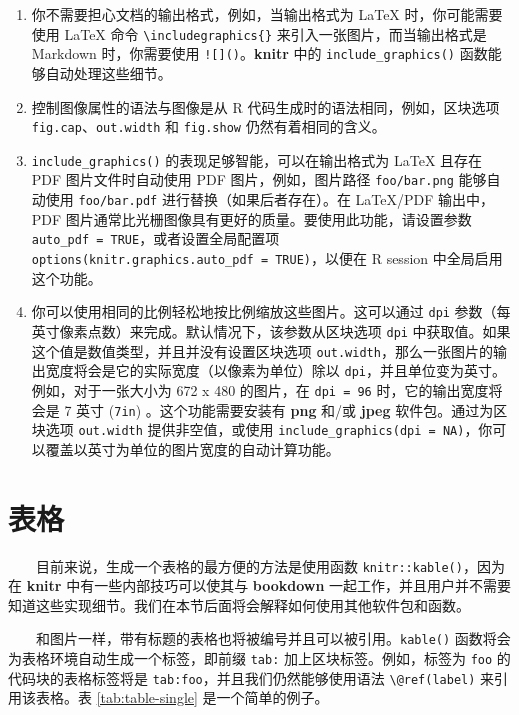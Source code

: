 \documentclass[
  12pt,
]{krantz}
\providecommand{\tightlist}{%
  \setlength{\itemsep}{0pt}\setlength{\parskip}{0pt}}
\theoremstyle{definition}
\theoremstyle{definition}
\theoremstyle{definition}
\theoremstyle{definition}
\theoremstyle{remark}
\begin{document}
\begin{enumerate}
\def\labelenumi{\arabic{enumi}.}
\tightlist
\item
  你不需要担心文档的输出格式，例如，当输出格式为 LaTeX 时，你可能需要使用 LaTeX 命令 \texttt{\textbackslash{}includegraphics\{\}} 来引入一张图片，而当输出格式是 Markdown 时，你需要使用 \texttt{!{[}{]}()}。\textbf{knitr} 中的 \texttt{include\_graphics()} 函数能够自动处理这些细节。
\item
  控制图像属性的语法与图像是从 R 代码生成时的语法相同，例如，区块选项 \texttt{fig.cap}、\texttt{out.width} 和 \texttt{fig.show} 仍然有着相同的含义。
\item
  \texttt{include\_graphics()} 的表现足够智能，可以在输出格式为 LaTeX 且存在 PDF 图片文件时自动使用 PDF 图片，例如，图片路径 \texttt{foo/bar.png} 能够自动使用 \texttt{foo/bar.pdf} 进行替换（如果后者存在）。在 LaTeX/PDF 输出中，PDF 图片通常比光栅图像具有更好的质量。要使用此功能，请设置参数 \texttt{auto\_pdf\ =\ TRUE}，或者设置全局配置项 \texttt{options(knitr.graphics.auto\_pdf\ =\ TRUE)}，以便在 R session 中全局启用这个功能。
\item
  你可以使用相同的比例轻松地按比例缩放这些图片。这可以通过 \texttt{dpi} 参数（每英寸像素点数）来完成。默认情况下，该参数从区块选项 \texttt{dpi} 中获取值。如果这个值是数值类型，并且并没有设置区块选项 \texttt{out.width}，那么一张图片的输出宽度将会是它的实际宽度（以像素为单位）除以 \texttt{dpi}，并且单位变为英寸。例如，对于一张大小为 672 x 480 的图片，在 \texttt{dpi\ =\ 96} 时，它的输出宽度将会是 7 英寸 (\texttt{7in}) 。这个功能需要安装有 \textbf{png} 和/或 \textbf{jpeg} 软件包。通过为区块选项 \texttt{out.width} 提供非空值，或使用 \texttt{include\_graphics(dpi\ =\ NA)}，你可以覆盖以英寸为单位的图片宽度的自动计算功能。
\end{enumerate}

\hypertarget{tables}{%
\section{表格}\label{tables}}

  目前来说，生成一个表格的最方便的方法是使用函数 \texttt{knitr::kable()}，因为在 \textbf{knitr} 中有一些内部技巧可以使其与 \textbf{bookdown} 一起工作，并且用户并不需要知道这些实现细节。我们在本节后面将会解释如何使用其他软件包和函数。

  和图片一样，带有标题的表格也将被编号并且可以被引用。\texttt{kable()} 函数将会为表格环境自动生成一个标签，即前缀 \texttt{tab:} 加上区块标签。例如，标签为 \texttt{foo} 的代码块的表格标签将是 \texttt{tab:foo}，并且我们仍然能够使用语法 \texttt{\textbackslash{}@ref(label)} 来引用该表格。表 \ref{tab:table-single} 是一个简单的例子。
\end{document}

